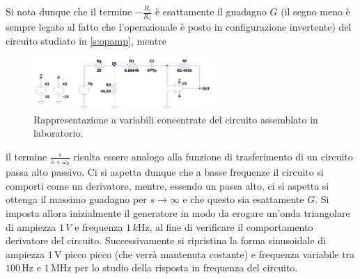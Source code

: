 \documentclass[a4paper,11pt]{article} %
\begin{document}
\noindent Si nota dunque che il termine $-\frac{R_{\text{f}}}{R_{1}}$ è esattamente il guadagno $G$ (il segno meno è
sempre legato al fatto che l'operazionale è posto in configurazione invertente) del circuito studiato in
\autoref{s:opamp}, mentre

\begin{figure}
	\centering
	\includegraphics[width=0.6\textwidth]{../Simulations/Differentiator/circuit_image_big.png}
	\caption{\footnotesize Rappresentazione a variabili concentrate del circuito assemblato in laboratorio.}
	\label{i:diff_circuit}
\end{figure}

\noindent  il termine $\frac{s}{s+\omega_{0}}$ risulta essere analogo alla funzione di trasferimento di un circuito
passa alto passivo. Ci si aspetta dunque che a basse frequenze il circuito si comporti come un derivatore, mentre,
essendo un passa alto, ci si aspetta si ottenga il massimo guadagno per $s\rightarrow\infty$ e che questo sia
esattamente $G$. Si imposta allora inizialmente il generatore in modo da erogare un'onda triangolare di ampiezza
$1\,\si{V}$ e frequenza $1\,\si{k\Hz}$, al fine di verificare il comportamento derivatore del circuito. Successivamente
si ripristina la forma sinusoidale di ampiezza $1\,\si{\volt}$ picco picco (che verrà mantenuta costante) e frequenza
variabile tra $100\,\si{\Hz}$ e $1\,\si{\MHz}$ per lo studio della risposta in frequenza del circuito.
\end{document}

